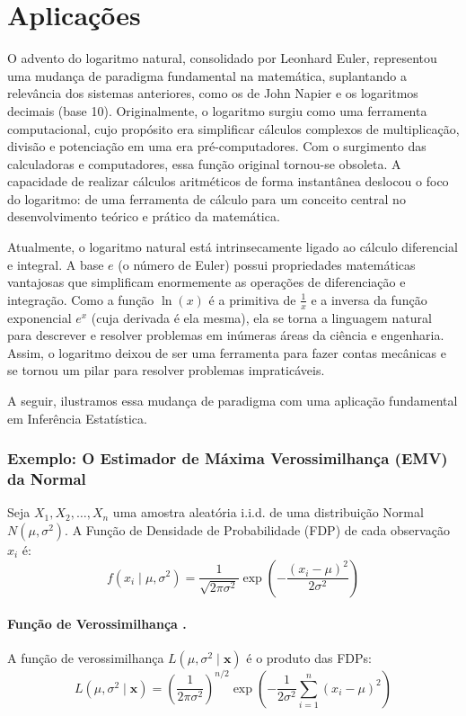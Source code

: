 \section{Aplicações}

O advento do logaritmo natural, consolidado por Leonhard Euler, representou uma mudança de paradigma fundamental na matemática, suplantando a relevância dos sistemas anteriores, como os de John Napier e os logaritmos decimais (base 10). Originalmente, o logaritmo surgiu como uma ferramenta computacional, cujo propósito era simplificar cálculos complexos de multiplicação, divisão e potenciação em uma era pré-computadores. Com o surgimento das calculadoras e computadores, essa função original tornou-se obsoleta. A capacidade de realizar cálculos aritméticos de forma instantânea deslocou o foco do logaritmo: de uma ferramenta de cálculo para um conceito central no desenvolvimento teórico e prático da matemática.

Atualmente, o logaritmo natural está intrinsecamente ligado ao cálculo diferencial e integral. A base $e$ (o número de Euler) possui propriedades matemáticas vantajosas que simplificam enormemente as operações de diferenciação e integração. Como a função $\ln(x)$ é a primitiva de $\frac{1}{x}$ e a inversa da função exponencial $e^x$ (cuja derivada é ela mesma), ela se torna a linguagem natural para descrever e resolver problemas em inúmeras áreas da ciência e engenharia. Assim, o logaritmo deixou de ser uma ferramenta para fazer contas mecânicas e se tornou um pilar para resolver problemas impraticáveis.

A seguir, ilustramos essa mudança de paradigma com uma aplicação fundamental em Inferência Estatística.

\subsubsection*{Exemplo: O Estimador de Máxima Verossimilhança (EMV) da Normal}
Seja $X_1, X_2, \ldots, X_n$ uma amostra aleatória i.i.d. de uma distribuição Normal $N(\mu, \sigma^2)$. A Função de Densidade de Probabilidade (FDP) de cada observação $x_i$ é:
\[
f(x_i \mid \mu, \sigma^2) = \frac{1}{\sqrt{2\pi\sigma^2}} \exp\left( -\frac{(x_i-\mu)^2}{2\sigma^2} \right)
\]

\paragraph{Função de Verossimilhança .}
A função de verossimilhança $L(\mu, \sigma^2 \mid \mathbf{x})$ é o produto das FDPs:
\begin{equation} \label{eq:likelihood}
    L(\mu, \sigma^2 \mid \mathbf{x}) = \left( \frac{1}{2\pi\sigma^2} \right)^{n/2} \exp\left( -\frac{1}{2\sigma^2} \sum_{i=1}^{n} (x_i-\mu)^2 \right)
\end{equation}

